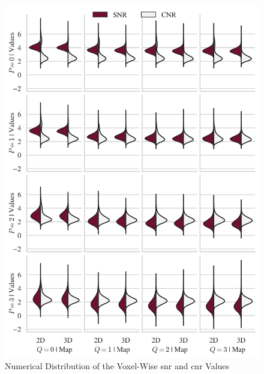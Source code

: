 \begin{figure}[htbp!]
\centering
\includegraphics{images/cnrsnr.png}
\caption{Numerical Distribution of the Voxel-Wise \gls{snr} and \gls{cnr} Values}
\label{fig:cnrsnr}
\end{figure}

